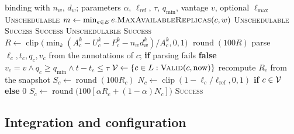\begin{algorithm}[t]
\caption{Filter, score and normalisation procedures of the proposed plugins}\label{alg:netresource}
\small{}
\begin{algorithmic}[1]
\Require binding with $n_w$, $d_w$; parameters $\alpha$, $\ell_{\mathrm{ref}}$, $\tau$, $q_{\min}$, vantage $v$, optional $\ell_{\max}$
 
   \Return \textsc{Unschedulable} \EndIf
  \State $m \gets \min_{e \in E} e.\textsc{MaxAvailableReplicas}(c, w)$ 
   \Return \textsc{Unschedulable} \EndIf
  \State \Return \textsc{Success}
\EndProcedure
{} 
   \Return \textsc{Success} \EndIf
   \Return \textsc{Unschedulable} \EndIf
  \State \Return \textsc{Success}
\EndProcedure
{} 
  \State $R \gets \operatorname{clip}\big(\min_{k} (A_c^k - U_c^k - P_c^k - n_w d_w^k)/A_c^k, 0, 1\big)$ 
  \State \Return $\operatorname{round}(100 R)$ 
\EndProcedure
{}
  \State parse $\ell_c, t_c, q_c, v_c$ from the annotations of $c$; \textbf{if} parsing fails \Return \textbf{false}
  \State \Return $v_c = v \wedge q_c \geq q_{\min} \wedge t - t_c \leq \tau$ 
\EndFunction
{} 
  \State $\mathcal{V} \gets \{ c \in L : \textsc{Valid}(c, \mathrm{now}) \}$
    \State recompute $R_c$ from the snapshot 
    \If{$\Vset = \emptyset$} $S_c \gets \operatorname{round}(100 R_c)$ 
    \Else
      \State $N_c \gets \operatorname{clip}(1 - \ell_c/\ell_{\mathrm{ref}}, 0, 1)$ \textbf{if} $c \in \mathcal{V}$ \textbf{else} $0$ 
      \State $S_c \gets \operatorname{round}\big(100[\alpha R_c + (1-\alpha) N_c]\big)$
    \EndIf
  \EndFor
  \State \Return \textsc{Success}
\EndProcedure
\end{algorithmic}
\end{algorithm}

\subsection{Integration and configuration}\label{sec:alg-config}


